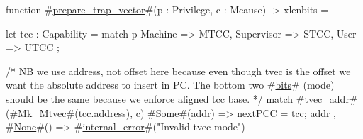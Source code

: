 function #\hyperref[sailRISCVzpreparezytrapzyvector]{prepare\_trap\_vector}#(p : Privilege, c : Mcause) -> xlenbits = {
  let tcc : Capability = match p {
                           Machine    => MTCC,
                           Supervisor => STCC,
                           User       => UTCC
                         };

  /* NB we use address, not offset here because even though tvec is the offset
     we want the absolute address to insert in PC. The bottom two #\hyperref[sailRISCVzbits]{bits}# (mode) should 
     be the same because we enforce aligned tcc base. */
  match #\hyperref[sailRISCVztveczyaddr]{tvec\_addr}#(#\hyperref[sailRISCVzMkzyMtvec]{Mk\_Mtvec}#(tcc.address), c) { 
    #\hyperref[sailRISCVzSome]{Some}#(addr) => { nextPCC = tcc; addr },
    #\hyperref[sailRISCVzNone]{None}#()     => #\hyperref[sailRISCVzinternalzyerror]{internal\_error}#("Invalid tvec mode")
  }
}
